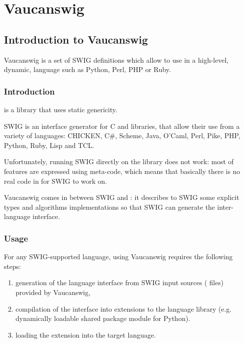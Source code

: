 \chapter{Vaucanswig}
\label{sec:swig}

\section{Introduction to Vaucanswig}

Vaucanswig is a set of SWIG definitions which allow to use \Vauc in a
high-level, dynamic, language such as Python, Perl, PHP or Ruby.

\subsection{Introduction}

\Vauc is a \Cxx library that uses static genericity.

SWIG is an interface generator for C and \Cxx libraries, that allow
their use from a variety of languages: CHICKEN, C\#, Scheme, Java,
O'Caml, Perl, Pike, PHP, Python, Ruby, Lisp and TCL.

Unfortunately, running SWIG directly on the \Vauc library does not
work: most of \Vauc features are expressed using \Cxx meta-code,
which means that basically there is no real code in \Vauc for SWIG
to work on.

Vaucanswig comes in between SWIG and \Vauc: it describes to SWIG
some explicit \Vauc types and algorithms implementations so that
SWIG can generate the inter-language interface.

\subsection{Usage}

For  any  SWIG-supported   language,  using  Vaucanswig  requires  the
following steps:

\begin{enumerate}
\item generation of the language interface from SWIG input sources
  ( files) provided by Vaucanswig,

\item compilation of the interface into extensions to the language
  library (e.g.  dynamically loadable shared package module for
  Python).

\item loading the extension into the target language.
\end{enumerate}

